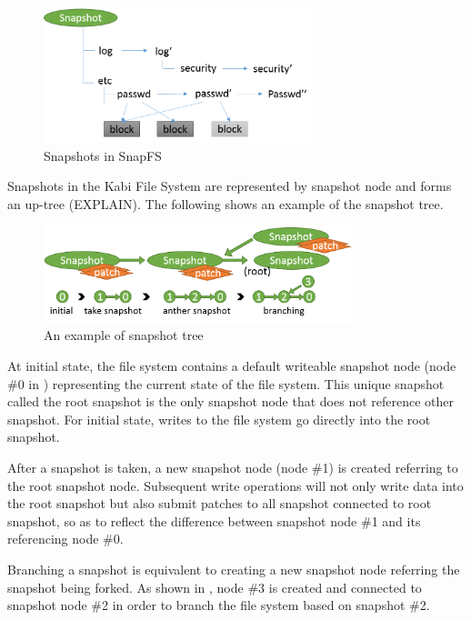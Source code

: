 \begin{figure}[hbtp]
\centering
\includegraphics[width=0.7\textwidth]{Chapter-4/figs/fig24.png}
\caption{Snapshots in SnapFS}
\label{fig:snapfs_approach}
\end{figure}

    Snapshots in the Kabi File System are represented by snapshot node and forms an up-tree (EXPLAIN). The following  shows an example of the snapshot tree.

\begin{figure}[hbtp]
\centering
\includegraphics[width=0.8\textwidth]{Chapter-4/figs/fig13.png}
\caption{An example of snapshot tree}
\label{fig:snap_tree_example}
\end{figure}

    At initial state, the file system contains a default writeable snapshot node (node \#0 in ) representing the current state of the file system. This unique snapshot called the root snapshot is the only snapshot node that does not reference other snapshot. For initial state, writes to the file system go directly into the root snapshot.
    
    After a snapshot is taken, a new snapshot node (node \#1) is created referring to the root snapshot node. Subsequent write operations will not only write data into the root snapshot but also submit patches to all snapshot connected to root snapshot, so as to reflect the difference between snapshot node \#1 and its referencing node \#0.

    Branching a snapshot is equivalent to creating a new snapshot node referring the snapshot being forked. As shown in , node \#3 is created and connected to snapshot node \#2 in order to branch the file system based on snapshot \#2.

